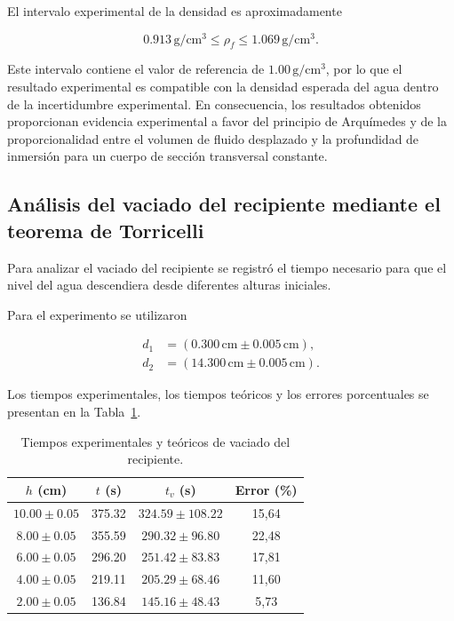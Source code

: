 El intervalo experimental de la densidad es aproximadamente

\begin{equation}
0.913\,\mathrm{g/cm^3}
\leq
\rho_f
\leq
1.069\,\mathrm{g/cm^3}.
\end{equation}

Este intervalo contiene el valor de referencia de $1.00\,\mathrm{g/cm^3}$, 
por lo que el resultado experimental es compatible con la densidad esperada del agua dentro de la incertidumbre experimental. 
En consecuencia, los resultados obtenidos proporcionan evidencia experimental a favor del principio de Arquímedes y de la proporcionalidad entre el volumen de fluido desplazado y la profundidad de inmersión para un cuerpo de sección transversal constante.

\subsection{Análisis del vaciado del recipiente mediante el teorema de Torricelli}

Para analizar el vaciado del recipiente se registró el tiempo necesario para que el nivel del agua descendiera desde diferentes alturas iniciales. 

Para el experimento se utilizaron

\begin{equation}
\begin{aligned}
d_1&=(0.300\,\mathrm{cm}\pm0.005\,\mathrm{cm}),\\
d_2&=(14.300\,\mathrm{cm}\pm0.005\,\mathrm{cm}).
\end{aligned}
\end{equation}

Los tiempos experimentales, los tiempos teóricos y los errores porcentuales se presentan en la Tabla~\ref{tab:torricelli}.

\begin{table}[htbp]
\centering
\caption{Tiempos experimentales y teóricos de vaciado del recipiente.}
\label{tab:torricelli}
\scriptsize
\begin{tabular}{cccc}
\hline
$h$ (cm) & $t$ (s) & $t_v$ (s) & Error (\%) \\
\hline
$10.00\pm0.05$ & 375.32 & $324.59\pm108.22$ & 15{,}64 \\
$8.00\pm0.05$ & 355.59 & $290.32\pm96.80$ & 22{,}48 \\
$6.00\pm0.05$ & 296.20 & $251.42\pm83.83$ & 17{,}81 \\
$4.00\pm0.05$ & 219.11 & $205.29\pm68.46$ & 11{,}60 \\
$2.00\pm0.05$ & 136.84 & $145.16\pm48.43$ & 5{,}73 \\
\hline
\end{tabular}
\end{table}


